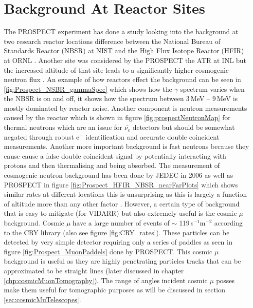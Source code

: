 \section{Background At Reactor Sites}
The PROSPECT experiment has done a  study looking into the background at two research reactor locations difference between the National Bureau of Standards Reactor (NBSR) at NIST and the High Flux Isotope Reactor (HFIR) at ORNL \cite{Ashenfelter_2016}. Another site was considered by the PROSPECT the ATR at INL but the increased altitude of that site leads to a significantly higher cosmogenic neutron flux \cite{Ashenfelter_2016}. An example of how reactors effect the background can be seen in \ref{fig:Prospect_NSBR_gammaSpec} which shows how the $\gamma$ spectrum varies when the NBSR is on and off, it shows how the spectrum between 3\,MeV -- 9\,MeV is mostly dominated by reactor noise. Another component is neutron measurements caused by the reactor which is shown in figure \ref{fig:prospectNeutronMap} for thermal neutrons which are an issue for $\bar{\nu_e}$ detectors but should be somewhat negated through robust e$^+$ identification and accurate double coincident measurements. Another more important background is fast neutrons because they cause cause a false double coincident signal by potentially interacting with protons and then thermalising and being absorbed. The measurement of cosmogenic neutron background has been done by JEDEC in 2006 \cite{JEDEC_2006} as well as PROSPECT in figure \ref{fig:Prospect_HFIR_NBSR_nearFarPlots} which shows similar rates at different locations this is unsurprising as this is largely a function of altitude more than any other factor \cite{Ashenfelter_2016}. However, a certain type of background that is easy to mitigate (for VIDARR) but also extremely useful is the cosmic $\mu$ background. Cosmic $\mu$ have a large number of events of $\sim$ 119\,s$^{-1}$m$^{-2}$ according to the CRY library \cite{ieee_cry_2007} (also see figure \ref{fig:CRY_rates}). These particles can be detected by very simple detector requiring only a series of paddles as seen in figure \ref{fig:Prospect_MuonPaddels} done by PROSPECT. This cosmic $\mu$ background is useful as they are highly penetrating particles tracks that can be approximated to be straight lines (later discussed in chapter \ref{chp:cosmicMuonTomography}). The range of angles incident cosmic $\mu$ posses make them useful for tomographic purposes as will be discussed in section \ref{sec:cosmicMuTelescopes}. %

